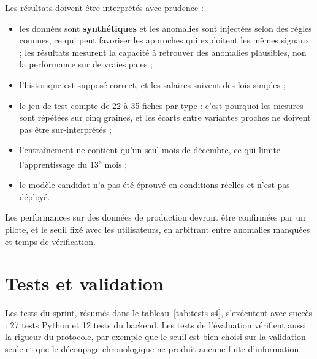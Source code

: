 Les résultats doivent être interprétés avec prudence :
\begin{itemize}
    \item les données sont \textbf{synthétiques} et les anomalies sont injectées selon des règles connues, ce qui peut favoriser les approches qui exploitent les mêmes signaux ; les résultats mesurent la capacité à retrouver des anomalies plausibles, non la performance sur de vraies paies ;
    \item l'historique est supposé correct, et les salaires suivent des lois simples ;
    \item le jeu de test compte de 22 à 35 fiches par type : c'est pourquoi les mesures sont répétées sur cinq graines, et les écarts entre variantes proches ne doivent pas être sur-interprétés ;
    \item l'entraînement ne contient qu'un seul mois de décembre, ce qui limite l'apprentissage du 13\textsuperscript{e} mois ;
    \item le modèle candidat n'a pas été éprouvé en conditions réelles et n'est pas déployé.
\end{itemize}
Les performances sur des données de production devront être confirmées par un pilote, et le seuil fixé avec les utilisateurs, en arbitrant entre anomalies manquées et temps de vérification.

\section{Tests et validation}

Les tests du sprint, résumés dans le tableau~\ref{tab:tests-s4}, s'exécutent avec succès : 27 tests Python et 12 tests du backend. Les tests de l'évaluation vérifient aussi la rigueur du protocole, par exemple que le seuil est bien choisi sur la validation seule et que le découpage chronologique ne produit aucune fuite d'information.

